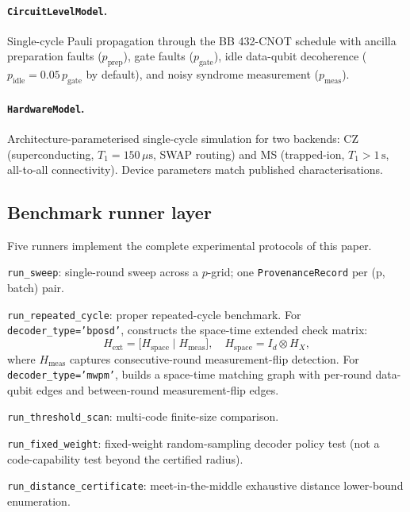 \documentclass[11pt,a4paper]{article}
\begin{document}
\paragraph{\texttt{CircuitLevelModel}.}
Single-cycle Pauli propagation through the BB 432-CNOT schedule with
ancilla preparation faults ($p_{\mathrm{prep}}$), gate faults
($p_{\mathrm{gate}}$), idle data-qubit decoherence
($p_{\mathrm{idle}} = 0.05\,p_{\mathrm{gate}}$ by default), and noisy
syndrome measurement ($p_{\mathrm{meas}}$).

\paragraph{\texttt{HardwareModel}.}
Architecture-parameterised single-cycle simulation for two backends:
CZ (superconducting, $T_1=150\,\mu\text{s}$, SWAP routing) and
MS (trapped-ion, $T_1>1\,\text{s}$, all-to-all connectivity).
Device parameters match published characterisations.

\subsection{Benchmark runner layer}

Five runners implement the complete experimental protocols of this paper.

\texttt{run\_sweep}: single-round sweep across a $p$-grid; one
\texttt{ProvenanceRecord} per (p, batch) pair.

\texttt{run\_repeated\_cycle}: proper repeated-cycle benchmark.
For \texttt{decoder\_type='bposd'}, constructs the space-time extended
check matrix:
\begin{equation}
  H_{\mathrm{ext}}
  = \bigl[H_{\mathrm{space}}\;\big|\;H_{\mathrm{meas}}\bigr],
  \quad H_{\mathrm{space}} = I_d \otimes H_X,
  \label{eq:spacetime}
\end{equation}
where $H_{\mathrm{meas}}$ captures consecutive-round measurement-flip
detection.
For \texttt{decoder\_type='mwpm'}, builds a space-time matching graph
with per-round data-qubit edges and between-round measurement-flip edges.

\texttt{run\_threshold\_scan}: multi-code finite-size comparison.

\texttt{run\_fixed\_weight}: fixed-weight random-sampling decoder policy
test (not a code-capability test beyond the certified radius).

\texttt{run\_distance\_certificate}: meet-in-the-middle exhaustive
distance lower-bound enumeration.
\end{document}
